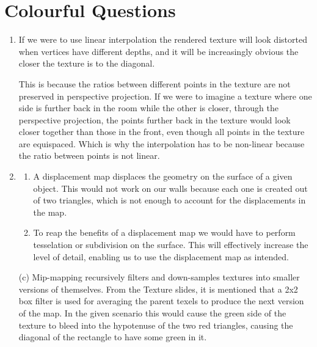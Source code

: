 \documentclass[11pt,a4paper]{report}
\begin{document}
\section{Colourful Questions}
\begin{enumerate}[label=(\alph*)]\setcounter{enumi}{0}
	\item If we were to use linear interpolation the rendered texture will look distorted when vertices have different depths, and it will be increasingly obvious the closer the texture is to the diagonal.
	
	This is because the ratios between different points in the texture are not preserved in perspective projection.
	If we were to imagine a texture where one side is further back in the room while the other is closer, through the perspective projection, the points further back in the texture would look closer together than those in the front, even though all points in the texture are equispaced. Which is why the interpolation has to be non-linear because the ratio between points is not linear.
	
	\item \begin{enumerate}[label=(\alph*)]\setcounter{enumi}{0}
		\item A displacement map displaces the geometry on the surface of a given object. This would not work on our walls because each one is created out of two triangles, which is not enough to account for the displacements in the map.
		\item To reap the benefits of a displacement map we would have to perform tesselation or subdivision on the surface. This will effectively increase the level of detail, enabling us to use the displacement map as intended. \end{enumerate}

	\item[(c)] Mip-mapping recursively filters and down-samples textures into smaller versions of themselves. From the Texture slides, it is mentioned that a 2x2 box filter is used for averaging the parent texels to produce the next version of the map.
	In the given scenario this would cause the green side of the texture to bleed into the hypotenuse of the two red triangles, causing the diagonal of the rectangle to have some green in it.
	
	
	
\end{enumerate}

\clearpage
\end{document}
